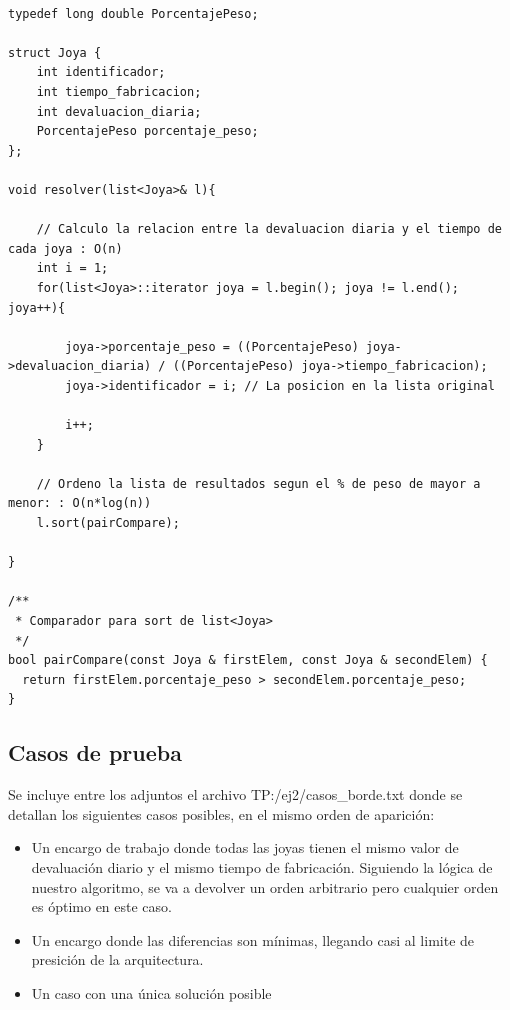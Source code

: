 \begin{lstlisting}
               
typedef long double PorcentajePeso;

struct Joya {
	int identificador;
	int tiempo_fabricacion;
	int devaluacion_diaria;
	PorcentajePeso porcentaje_peso;
};

void resolver(list<Joya>& l){
	
	// Calculo la relacion entre la devaluacion diaria y el tiempo de cada joya : O(n)
	int i = 1;
	for(list<Joya>::iterator joya = l.begin(); joya != l.end(); joya++){
		
		joya->porcentaje_peso = ((PorcentajePeso) joya->devaluacion_diaria) / ((PorcentajePeso) joya->tiempo_fabricacion);
		joya->identificador = i; // La posicion en la lista original
		
		i++;
	}
	
	// Ordeno la lista de resultados segun el % de peso de mayor a menor: : O(n*log(n)) 
	l.sort(pairCompare);

}

/**
 * Comparador para sort de list<Joya>
 */
bool pairCompare(const Joya & firstElem, const Joya & secondElem) {
  return firstElem.porcentaje_peso > secondElem.porcentaje_peso;
}
\end{lstlisting}

\subsection{Casos de prueba}

Se incluye entre los adjuntos el archivo TP:/ej2/casos\_borde.txt donde se detallan los siguientes casos posibles, en el mismo orden de aparici\'on:

\begin{itemize}
\item Un encargo de trabajo donde todas las joyas tienen el mismo valor de devaluaci\'on diario y el mismo tiempo de fabricaci\'on. Siguiendo la l\'ogica de nuestro algoritmo, se va a devolver un orden arbitrario pero cualquier orden es \'optimo en este caso.
\item Un encargo donde las diferencias son m\'inimas, llegando casi al limite de presici\'on de la arquitectura.
\item Un caso con una \'unica soluci\'on posible
\end{itemize}


